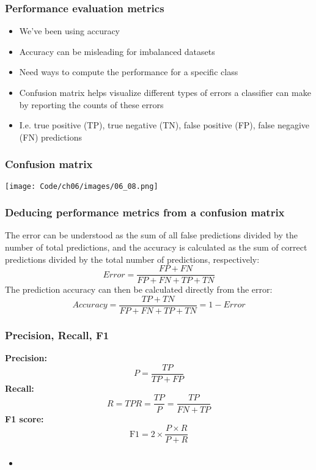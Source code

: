 \documentclass{beamer}
\begin{document}
\begin{frame}
  \frametitle{Performance evaluation metrics}
  \begin{itemize}
  \item We've been using accuracy
  \item Accuracy can be misleading for imbalanced datasets
  \item Need ways to compute the performance for a specific class
  \item Confusion matrix helps visualize different types of errors a classifier can make by reporting the counts of these errors
  \item I.e. true positive (TP), true negative (TN), false positive (FP), false negagive (FN) predictions
  \end{itemize}
\end{frame}

\begin{frame}
  \frametitle{Confusion matrix}
  \texttt{[image: Code/ch06/images/06\_08.png]}
\end{frame}

\begin{frame}
  \frametitle{Deducing performance metrics from a confusion matrix}
  The error can be understood as the sum of all false predictions divided by the number of total predictions, and the accuracy is calculated as the sum of correct predictions divided by the total number of predictions, respectively:
  \[
  Error = \frac{FP + FN}{FP + FN + TP + TN}
  \]
  The prediction accuracy can then be calculated directly from the error:
  \[
  Accuracy = \frac{TP + TN}{FP + FN + TP + TN} = 1 - Error
  \]
\end{frame}

\begin{frame}
  \frametitle{Precision, Recall, F1}
  \textbf{Precision:}
  \[
  P = \frac{TP}{TP + FP}
  \]
  \textbf{Recall:}
  \[
  R = TPR = \frac{TP}{P} = \frac{TP}{FN + TP}
  \]
  \textbf{F1 score:}
  \[
  \text{F1} = 2 \times \frac{P \times R}{P + R}
  \]
\end{frame}

\begin{frame}
  \frametitle{}
  \begin{itemize}
  \item 
  \end{itemize}
\end{frame}
\end{document}
